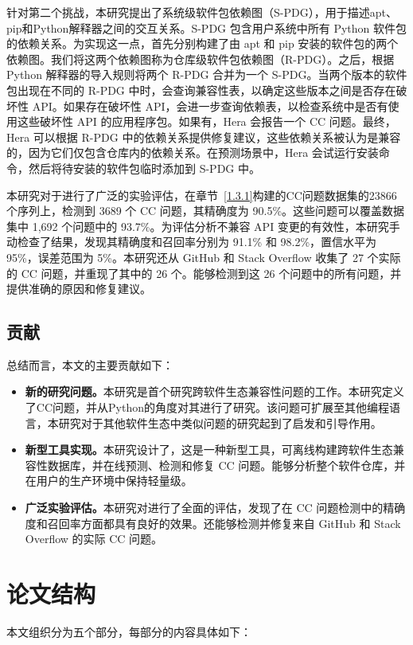 针对第二个挑战，本研究提出了系统级软件包依赖图（S-PDG），用于描述apt、pip和Python解释器之间的交互关系。S-PDG 包含用户系统中所有 Python 软件包的依赖关系。为实现这一点，\tool{}首先分别构建了由 apt 和 pip 安装的软件包的两个依赖图。我们将这两个依赖图称为仓库级软件包依赖图（R-PDG）。之后，\tool{}根据 Python 解释器的导入规则将两个 R-PDG 合并为一个 S-PDG。当两个版本的软件包出现在不同的 R-PDG 中时，\tool{}会查询兼容性表，以确定这些版本之间是否存在破坏性 API。如果存在破坏性 API，\tool{}会进一步查询依赖表，以检查系统中是否有使用这些破坏性 API 的应用程序包。如果有，Hera 会报告一个 CC 问题。最终，Hera 可以根据 R-PDG 中的依赖关系提供修复建议，这些依赖关系被认为是兼容的，因为它们仅包含仓库内的依赖关系。在预测场景中，Hera 会试运行安装命令，然后将待安装的软件包临时添加到 S-PDG 中。

本研究对于\tool{}进行了广泛的实验评估，在章节~\ref{1.3.1}构建的CC问题数据集的23866个序列上，\tool{}检测到 3689 个 CC 问题，其精确度为 90.5\%。这些问题可以覆盖数据集中 1,692 个问题中的 93.7\%。为评估分析不兼容 API 变更的有效性，本研究手动检查了结果，发现其精确度和召回率分别为 91.1\% 和 98.2\%，置信水平为 95\%，误差范围为 5\%。本研究还从 GitHub 和 Stack Overflow 收集了 27 个实际的 CC 问题，并重现了其中的 26 个。\tool{}能够检测到这 26 个问题中的所有问题，并提供准确的原因和修复建议。
\subsection{贡献}
总结而言，本文的主要贡献如下： 
\begin{itemize}
	\item \textbf{新的研究问题。}本研究是首个研究跨软件生态兼容性问题的工作。本研究定义了CC问题，并从Python的角度对其进行了研究。该问题可扩展至其他编程语言，本研究对于其他软件生态中类似问题的研究起到了启发和引导作用。
	\item \textbf{新型工具实现。}本研究设计了\tool{}，这是一种新型工具，可离线构建跨软件生态兼容性数据库，并在线预测、检测和修复 CC 问题。\tool{}能够分析整个软件仓库，并在用户的生产环境中保持轻量级。
	\item \textbf{广泛实验评估。}本研究对\tool{}进行了全面的评估，发现了\tool{}在 CC 问题检测中的精确度和召回率方面都具有良好的效果。\tool{}还能够检测并修复来自 GitHub 和 Stack Overflow 的实际 CC 问题。
\end{itemize}
\section{论文结构}
本文组织分为五个部分，每部分的内容具体如下：

